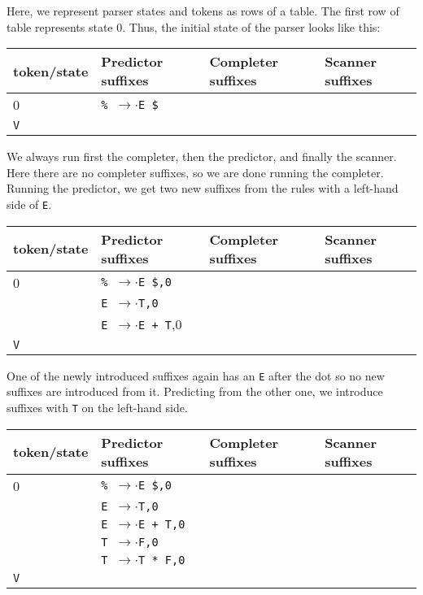 \documentclass[11pt]{article}
\def\ra{\rightarrow}
\begin{document}
Here, we represent parser states and tokens as rows of a table.  The
first row of table represents state $0$.  Thus, the initial state of
the parser looks like this:

\begin{tabular}{|l|l|l|l|}
\hline
token/state & Predictor suffixes & Completer suffixes & Scanner suffixes\\
\hline
0      & \texttt{\% $\rightarrow$$\cdot$E \$} & & \\
\hline
\texttt{V} &  & &\\
\hline
\end{tabular}

We always run first the completer, then the predictor, and finally the
scanner.  Here there are no completer suffixes, so we are done running
the completer.  Running the predictor, we get two new suffixes from
the rules with a left-hand side of \texttt{E}.

\begin{tabular}{|l|l|l|l|}
\hline
token/state & Predictor suffixes & Completer suffixes & Scanner suffixes\\
\hline
0     & \texttt{\% $\ra$$\cdot$E \$,0} & & \\
      & \texttt{E $\ra$$\cdot$T,0} & & \\
      & \texttt{E $\ra$$\cdot$E + T},0 & & \\
\hline
\texttt{V}     &  & &\\
\hline
\end{tabular}

One of the newly introduced suffixes again has an \texttt{E} after the
dot so no new suffixes are introduced from it.  Predicting from the
other one, we introduce suffixes with \texttt{T} on the left-hand
side. 

\begin{tabular}{|l|l|l|l|}
\hline
token/state & Predictor suffixes & Completer suffixes & Scanner suffixes\\
\hline
0     & \texttt{\% $\ra$$\cdot$E \$,0} & & \\
      & \texttt{E $\ra$$\cdot$T,0} & & \\
      & \texttt{E $\ra$$\cdot$E + T,0} & & \\
      & \texttt{T $\ra$$\cdot$F,0} & & \\
      & \texttt{T $\ra$$\cdot$T * F,0} & & \\
\hline
\texttt{V}     &  & &\\
\hline
\end{tabular}
\end{document}

